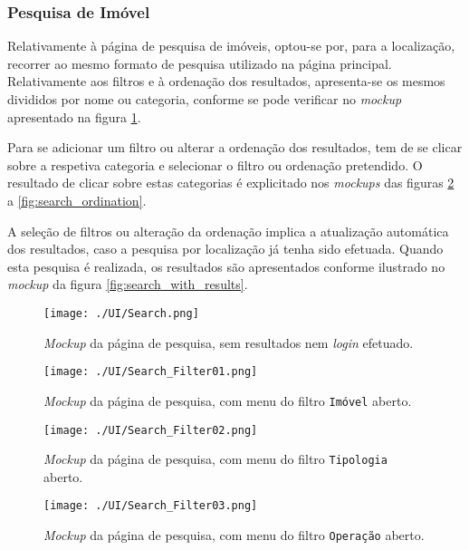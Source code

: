 \subsubsection{Pesquisa de Imóvel}

Relativamente à página de pesquisa de imóveis, optou-se por, para a localização, recorrer ao mesmo formato de pesquisa utilizado na página principal. Relativamente aos filtros e à ordenação dos resultados, apresenta-se os mesmos divididos por nome ou categoria, conforme se pode verificar no \textit{mockup} apresentado na figura \ref{fig:search}.

Para se adicionar um filtro ou alterar a ordenação dos resultados, tem de se clicar sobre a respetiva categoria e selecionar o filtro ou ordenação pretendido. O resultado de clicar sobre estas categorias é explicitado nos \textit{mockups} das figuras \ref{fig:search_filter01} a \ref{fig:search_ordination}.

A seleção de filtros ou alteração da ordenação implica a atualização automática dos resultados, caso a pesquisa por localização já tenha sido efetuada. Quando esta pesquisa é realizada, os resultados são apresentados conforme ilustrado no \textit{mockup} da figura \ref{fig:search_with_results}.

\begin{figure}[H]
    \centering
    \texttt{[image: ./UI/Search.png]}
    \caption{\textit{Mockup} da página de pesquisa, sem resultados nem \textit{login} efetuado.}
    \label{fig:search}
\end{figure}

\begin{figure}[H]
    \centering
    \texttt{[image: ./UI/Search\_Filter01.png]}
    \caption{\textit{Mockup} da página de pesquisa, com menu do filtro \texttt{Imóvel} aberto.}
    \label{fig:search_filter01}
\end{figure}

\begin{figure}[H]
    \centering
    \texttt{[image: ./UI/Search\_Filter02.png]}
    \caption{\textit{Mockup} da página de pesquisa, com menu do filtro \texttt{Tipologia} aberto.}
    \label{fig:search_filter02}
\end{figure}

\begin{figure}[H]
    \centering
    \texttt{[image: ./UI/Search\_Filter03.png]}
    \caption{\textit{Mockup} da página de pesquisa, com menu do filtro \texttt{Operação} aberto.}
    \label{fig:search_filter03}
\end{figure}

